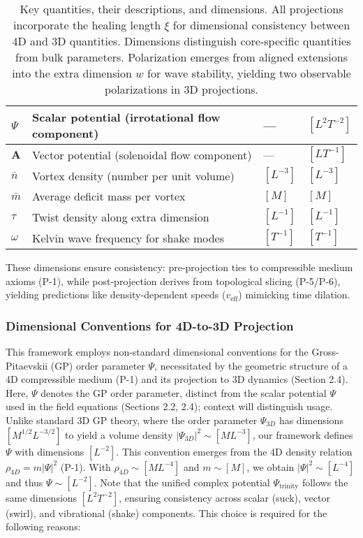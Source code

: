 \begin{table}[H]
\begin{tabularx}{\textwidth}{|l|Y|l|l|}
\hline
$\Psi$ & Scalar potential (irrotational flow component) & --- & $[L^2 T^{-2}]$ \\
\hline
$\mathbf{A}$ & Vector potential (solenoidal flow component) & --- & $[L T^{-1}]$ \\
\hline
$\bar{n}$ & Vortex density (number per unit volume) & $[L^{-3}]$ & $[L^{-3}]$ \\
\hline
$\bar{m}$ & Average deficit mass per vortex & $[M]$ & $[M]$ \\
\hline
$\tau$ & Twist density along extra dimension & $[L^{-1}]$ & $[L^{-1}]$ \\
\hline
$\omega$ & Kelvin wave frequency for shake modes & $[T^{-1}]$ & $[T^{-1}]$ \\
\hline
\end{tabularx}
\caption{Key quantities, their descriptions, and dimensions. All projections incorporate the healing length $\xi$ for dimensional consistency between 4D and 3D quantities. Dimensions distinguish core-specific quantities from bulk parameters. Polarization emerges from aligned extensions into the extra dimension $w$ for wave stability, yielding two observable polarizations in 3D projections.}
\label{tab:notation}
\end{table}

These dimensions ensure consistency: pre-projection ties to compressible medium axioms (P-1), while post-projection derives from topological slicing (P-5/P-6), yielding predictions like density-dependent speeds ($v_{\text{eff}}$) mimicking time dilation.

\subsubsection{Dimensional Conventions for 4D-to-3D Projection}
\label{subsec:dimensional_conventions}

This framework employs non-standard dimensional conventions for the Gross-Pitaevskii (GP) order parameter $\Psi$, necessitated by the geometric structure of a 4D compressible medium (P-1) and its projection to 3D dynamics (Section 2.4). Here, $\Psi$ denotes the GP order parameter, distinct from the scalar potential $\Psi$ used in the field equations (Sections 2.2, 2.4); context will distinguish usage. Unlike standard 3D GP theory, where the order parameter $\Psi_{3D}$ has dimensions $[M^{1/2} L^{-3/2}]$ to yield a volume density $|\Psi_{3D}|^2 \sim [M L^{-3}]$, our framework defines $\Psi$ with dimensions $[L^{-2}]$. This convention emerges from the 4D density relation $\rho_{4D} = m |\Psi|^2$ (P-1). With $\rho_{4D} \sim [M L^{-4}]$ and $m \sim [M]$, we obtain $|\Psi|^2 \sim [L^{-4}]$ and thus $\Psi \sim [L^{-2}]$. Note that the unified complex potential $\Psi_{\text{trinity}}$ follows the same dimensions $[L^2 T^{-2}]$, ensuring consistency across scalar (suck), vector (swirl), and vibrational (shake) components. This choice is required for the following reasons:

